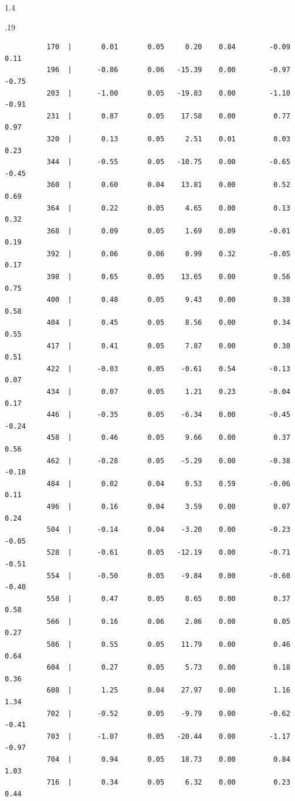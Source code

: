 \documentclass[10pt, letterpaper]{article}
\begin{document}
\begin{spacing}{1.4}
\begin{scriptsize}
\begin{spacing}{.19}
\begin{verbatim}
          170  |       0.01       0.05     0.20    0.84        -0.09        0.11
          196  |      -0.86       0.06   -15.39    0.00        -0.97       -0.75
          203  |      -1.00       0.05   -19.83    0.00        -1.10       -0.91
          231  |       0.87       0.05    17.58    0.00         0.77        0.97
          320  |       0.13       0.05     2.51    0.01         0.03        0.23
          344  |      -0.55       0.05   -10.75    0.00        -0.65       -0.45
          360  |       0.60       0.04    13.81    0.00         0.52        0.69
          364  |       0.22       0.05     4.65    0.00         0.13        0.32
          368  |       0.09       0.05     1.69    0.09        -0.01        0.19
          392  |       0.06       0.06     0.99    0.32        -0.05        0.17
          398  |       0.65       0.05    13.65    0.00         0.56        0.75
          400  |       0.48       0.05     9.43    0.00         0.38        0.58
          404  |       0.45       0.05     8.56    0.00         0.34        0.55
          417  |       0.41       0.05     7.87    0.00         0.30        0.51
          422  |      -0.03       0.05    -0.61    0.54        -0.13        0.07
          434  |       0.07       0.05     1.21    0.23        -0.04        0.17
          446  |      -0.35       0.05    -6.34    0.00        -0.45       -0.24
          458  |       0.46       0.05     9.66    0.00         0.37        0.56
          462  |      -0.28       0.05    -5.29    0.00        -0.38       -0.18
          484  |       0.02       0.04     0.53    0.59        -0.06        0.11
          496  |       0.16       0.04     3.59    0.00         0.07        0.24
          504  |      -0.14       0.04    -3.20    0.00        -0.23       -0.05
          528  |      -0.61       0.05   -12.19    0.00        -0.71       -0.51
          554  |      -0.50       0.05    -9.84    0.00        -0.60       -0.40
          558  |       0.47       0.05     8.65    0.00         0.37        0.58
          566  |       0.16       0.06     2.86    0.00         0.05        0.27
          586  |       0.55       0.05    11.79    0.00         0.46        0.64
          604  |       0.27       0.05     5.73    0.00         0.18        0.36
          608  |       1.25       0.04    27.97    0.00         1.16        1.34
          702  |      -0.52       0.05    -9.79    0.00        -0.62       -0.41
          703  |      -1.07       0.05   -20.44    0.00        -1.17       -0.97
          704  |       0.94       0.05    18.73    0.00         0.84        1.03
          716  |       0.34       0.05     6.32    0.00         0.23        0.44

\end{verbatim}
\end{spacing}
\end{scriptsize}
\end{spacing}
\end{document}
